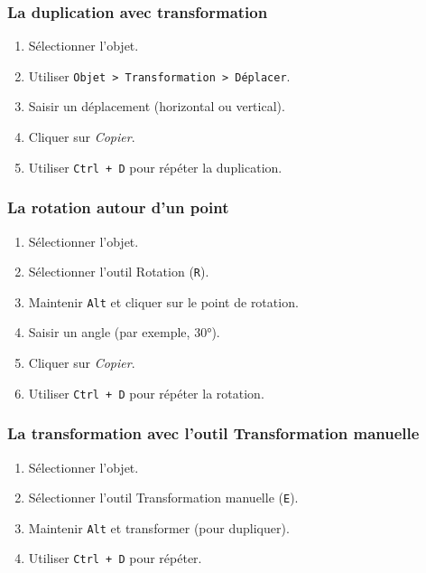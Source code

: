 \subsubsection{La duplication avec transformation}

\begin{enumerate}
    \item Sélectionner l'objet.
    \item Utiliser \texttt{Objet > Transformation > Déplacer}.
    \item Saisir un déplacement (horizontal ou vertical).
    \item Cliquer sur \emph{Copier}.
    \item Utiliser \texttt{Ctrl + D} pour répéter la duplication.
\end{enumerate}

\subsubsection{La rotation autour d'un point}

\begin{enumerate}
    \item Sélectionner l'objet.
    \item Sélectionner l'outil Rotation (\texttt{R}).
    \item Maintenir \texttt{Alt} et cliquer sur le point de rotation.
    \item Saisir un angle (par exemple, 30°).
    \item Cliquer sur \emph{Copier}.
    \item Utiliser \texttt{Ctrl + D} pour répéter la rotation.
\end{enumerate}

\subsubsection{La transformation avec l'outil Transformation manuelle}

\begin{enumerate}
    \item Sélectionner l'objet.
    \item Sélectionner l'outil Transformation manuelle (\texttt{E}).
    \item Maintenir \texttt{Alt} et transformer (pour dupliquer).
    \item Utiliser \texttt{Ctrl + D} pour répéter.
\end{enumerate}


